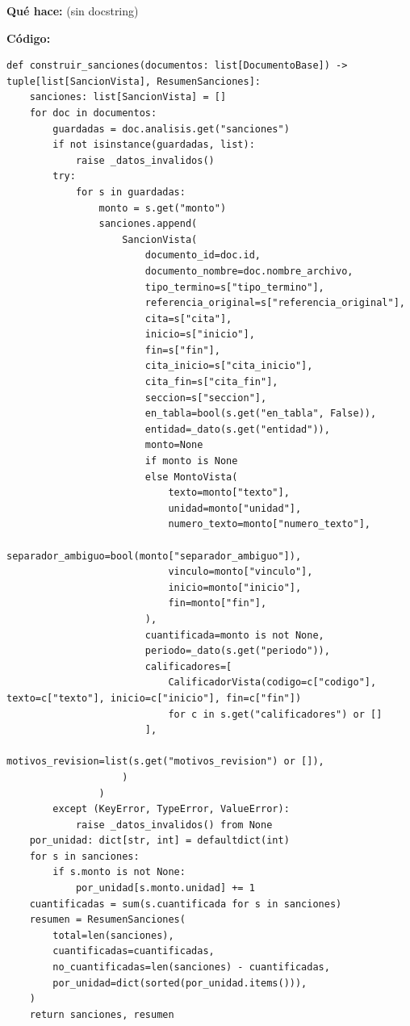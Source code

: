 \documentclass[11pt,a4paper]{article}
\begin{document}
\textbf{Qué hace:} (sin docstring)

\textbf{Código:}
\begin{lstlisting}
def construir_sanciones(documentos: list[DocumentoBase]) -> tuple[list[SancionVista], ResumenSanciones]:
    sanciones: list[SancionVista] = []
    for doc in documentos:
        guardadas = doc.analisis.get("sanciones")
        if not isinstance(guardadas, list):
            raise _datos_invalidos()
        try:
            for s in guardadas:
                monto = s.get("monto")
                sanciones.append(
                    SancionVista(
                        documento_id=doc.id,
                        documento_nombre=doc.nombre_archivo,
                        tipo_termino=s["tipo_termino"],
                        referencia_original=s["referencia_original"],
                        cita=s["cita"],
                        inicio=s["inicio"],
                        fin=s["fin"],
                        cita_inicio=s["cita_inicio"],
                        cita_fin=s["cita_fin"],
                        seccion=s["seccion"],
                        en_tabla=bool(s.get("en_tabla", False)),
                        entidad=_dato(s.get("entidad")),
                        monto=None
                        if monto is None
                        else MontoVista(
                            texto=monto["texto"],
                            unidad=monto["unidad"],
                            numero_texto=monto["numero_texto"],
                            separador_ambiguo=bool(monto["separador_ambiguo"]),
                            vinculo=monto["vinculo"],
                            inicio=monto["inicio"],
                            fin=monto["fin"],
                        ),
                        cuantificada=monto is not None,
                        periodo=_dato(s.get("periodo")),
                        calificadores=[
                            CalificadorVista(codigo=c["codigo"], texto=c["texto"], inicio=c["inicio"], fin=c["fin"])
                            for c in s.get("calificadores") or []
                        ],
                        motivos_revision=list(s.get("motivos_revision") or []),
                    )
                )
        except (KeyError, TypeError, ValueError):
            raise _datos_invalidos() from None
    por_unidad: dict[str, int] = defaultdict(int)
    for s in sanciones:
        if s.monto is not None:
            por_unidad[s.monto.unidad] += 1
    cuantificadas = sum(s.cuantificada for s in sanciones)
    resumen = ResumenSanciones(
        total=len(sanciones),
        cuantificadas=cuantificadas,
        no_cuantificadas=len(sanciones) - cuantificadas,
        por_unidad=dict(sorted(por_unidad.items())),
    )
    return sanciones, resumen
\end{lstlisting}
\end{document}
